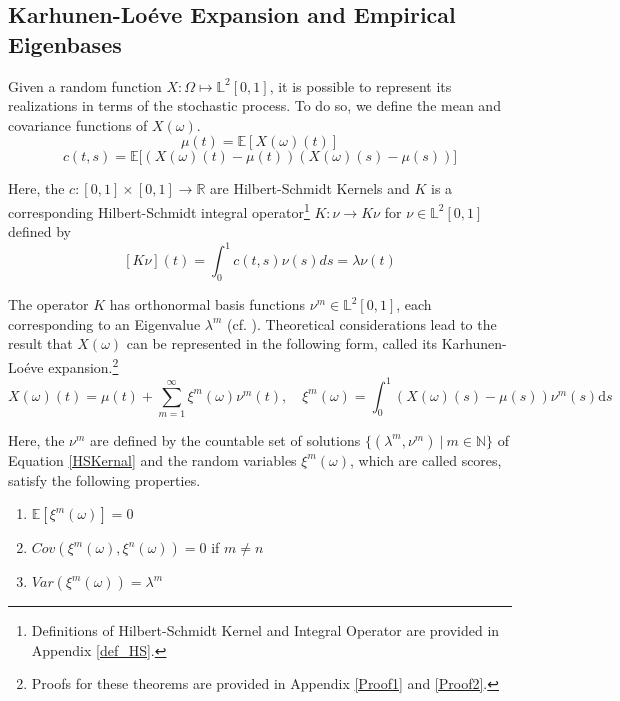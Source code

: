 \documentclass[11pt,twoside,a4paper]{article}
\begin{document}
	\subsection{Karhunen-Lo\'{e}ve Expansion and Empirical Eigenbases}\hypertarget{KL}{}
	Given a random function $X: \Omega \mapsto \mathbb{L}^2[0,1]$, it is possible to represent its realizations in terms of the stochastic process. To do so, we define the mean and covariance functions of $X(\omega)$.
	\begin{equation}\label{MeanFunction}
		\mu(t) = \mathbb{E}\left[ X(\omega)(t) \right]
	\end{equation}
	\begin{equation}\label{CovarianceFunction}
		c(t,s) = \mathbb{E}\big[ \left( X(\omega)(t) - \mu(t) \right) \left( X(\omega)(s) - \mu(s) \right) \big]
	\end{equation}

	Here, the $c: [0,1] \times [0,1] \rightarrow \mathbb{R}$ are Hilbert-Schmidt Kernels and $K$ is a corresponding Hilbert-Schmidt integral operator\footnote{Definitions of Hilbert-Schmidt Kernel and Integral Operator are provided in Appendix \ref{def_HS}.} $K : \nu \rightarrow K \nu$ for $\nu \in \mathbb{L}^{2}[0,1]$ defined by
	\begin{equation}\label{HSKernal}
		[K \nu](t) = \int_{0}^{1}c(t,s) \nu(s)ds = \lambda \nu(t)
	\end{equation}

	The operator $K$ has orthonormal basis functions $\nu^{m} \in \mathbb{L}^{2}[0,1]$, each corresponding to an Eigenvalue $\lambda^{m}$ (cf. \cite{alexanderian_KLexpansion_2015}).
	Theoretical considerations lead to the result that $X(\omega)$ can be represented in the following form, called its Karhunen-Lo\'{e}ve expansion.\footnote{Proofs for these theorems are provided in Appendix \ref{Proof1} and \ref{Proof2}.} 
	\begin{equation}\label{KarhunenLoeve}
		X(\omega)(t) = \mu(t) + \sum_{m = 1}^{\infty} \xi^m(\omega) \nu^m(t), \quad \xi^m(\omega) =  \int_{0}^{1} \left(X(\omega)(s) - \mu(s)\right) \nu^m(s) \mathrm{d}s
	\end{equation}

	Here, the $\nu^m$ are defined by the countable set of solutions $\{(\lambda^m, \nu^m) \: \vert \: m \in \mathbb{N}\}$ of Equation \ref{HSKernal} and the random variables $\xi^{m}(\omega)$, which are called scores, satisfy the following properties.
	\begin{multicols}{2}
		\begin{enumerate}
			\item $\mathbb{E}\left[\xi^m(\omega)\right] = 0$
			\item $Cov\left(\xi^m(\omega), \xi^n(\omega)\right) = 0$ if $m \neq n$
			\item $Var\left(\xi^m(\omega)\right) = \lambda^m$
		\end{enumerate}
	\end{multicols}
\end{document}
